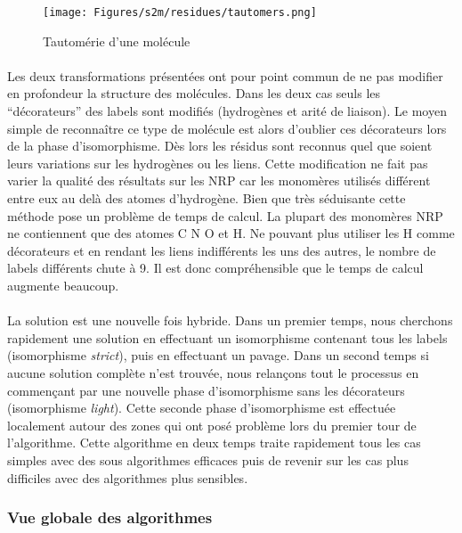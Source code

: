 \documentclass[12pt,french,twoside]{report}
\begin{document}
\begin{figure}
  \begin{center}
    \texttt{[image: Figures/s2m/residues/tautomers.png]}
    \caption{\label{tautomer}Tautomérie d'une molécule}
  \end{center}
\end{figure}

\paragraph{}Les deux transformations présentées ont pour point commun de ne pas modifier en profondeur la structure des molécules.
Dans les deux cas seuls les ``décorateurs'' des labels sont modifiés (hydrogènes et arité de liaison).
Le moyen simple de reconnaître ce type de molécule est alors d'oublier ces décorateurs lors de la phase d'isomorphisme.
Dès lors les résidus sont reconnus quel que soient leurs variations sur les hydrogènes ou les liens.
Cette modification ne fait pas varier la qualité des résultats sur les NRP car les monomères utilisés différent entre eux au delà des atomes d'hydrogène.
Bien que très séduisante cette méthode pose un problème de temps de calcul.
La plupart des monomères NRP ne contiennent que des atomes C N O et H.
Ne pouvant plus utiliser les H comme décorateurs et en rendant les liens indifférents les uns des autres, le nombre de labels différents chute à 9.
Il est donc compréhensible que le temps de calcul augmente beaucoup.

\paragraph{}La solution est une nouvelle fois hybride.
Dans un premier temps, nous cherchons rapidement une solution en effectuant un
isomorphisme contenant tous les labels (isomorphisme {\em strict}), puis en effectuant un pavage.
Dans un second temps si aucune solution complète n'est trouvée, nous relançons tout le processus en commençant par
une nouvelle phase d'isomorphisme sans les décorateurs (isomorphisme {\em light}).
Cette seconde phase d'isomorphisme est effectuée localement autour des zones qui ont posé problème lors du premier tour de 
l'algorithme.
Cette algorithme en deux temps traite rapidement tous les cas simples avec des sous algorithmes efficaces puis
de revenir sur les cas plus difficiles avec des algorithmes plus sensibles.

\subsubsection{Vue globale des algorithmes}
\end{document}
